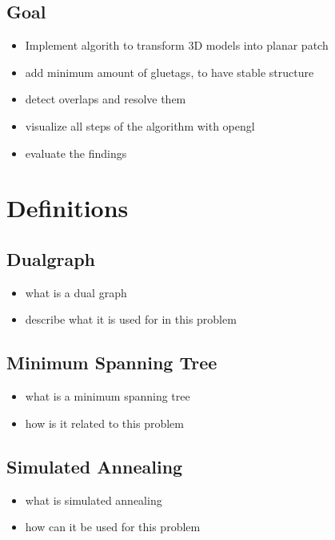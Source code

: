 \documentclass[draft,final]{vutinfth} %
\begin{document}
\section{Goal}

\begin{itemize}
	\item Implement algorith to transform 3D models into planar patch
	\item add minimum amount of gluetags, to have stable structure
	\item detect overlaps and resolve them
	\item visualize all steps of the algorithm with opengl
	\item evaluate the findings
\end{itemize}

\chapter{Definitions}

\section{Dualgraph}

\begin{itemize}
	\item what is a dual graph
	\item describe what it is used for in this problem
\end{itemize}

\section{Minimum Spanning Tree}

\begin{itemize}
	\item what is a minimum spanning tree
	\item how is it related to this problem
\end{itemize}

\section{Simulated Annealing}

\begin{itemize}
	\item what is simulated annealing
	\item how can it be used for this problem
\end{itemize}
\end{document}

